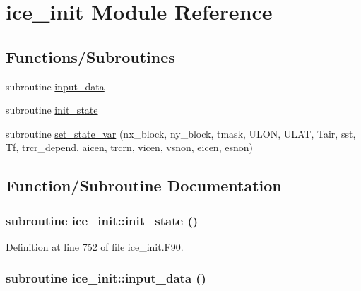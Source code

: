 \hypertarget{namespaceice__init}{
\section{ice\_\-init Module Reference}
\label{namespaceice__init}
}
\subsection*{Functions/Subroutines}
\begin{DoxyCompactItemize}
\item 
subroutine \hyperlink{namespaceice__init_a8aeb5361cfea01402260b8b2727a2f4a}{input\_\-data}
\item 
subroutine \hyperlink{namespaceice__init_aafefd572779d7e57a1c62b63ecec3813}{init\_\-state}
\item 
subroutine \hyperlink{namespaceice__init_a4b7d50da13bea3bc9e8c7f2e042963ec}{set\_\-state\_\-var} (nx\_\-block, ny\_\-block, tmask, ULON, ULAT, Tair, sst, Tf, trcr\_\-depend, aicen, trcrn, vicen, vsnon, eicen, esnon)
\end{DoxyCompactItemize}


\subsection{Function/Subroutine Documentation}
\hypertarget{namespaceice__init_aafefd572779d7e57a1c62b63ecec3813}{
\subsubsection[{init\_\-state}]{\setlength{\rightskip}{0pt plus 5cm}subroutine ice\_\-init::init\_\-state ()}}
\label{namespaceice__init_aafefd572779d7e57a1c62b63ecec3813}


Definition at line 752 of file ice\_\-init.F90.\hypertarget{namespaceice__init_a8aeb5361cfea01402260b8b2727a2f4a}{
\subsubsection[{input\_\-data}]{\setlength{\rightskip}{0pt plus 5cm}subroutine ice\_\-init::input\_\-data ()}}
\label{namespaceice__init_a8aeb5361cfea01402260b8b2727a2f4a}



